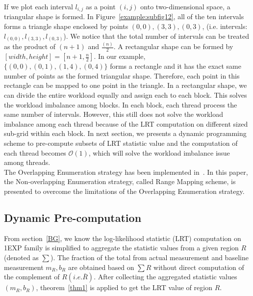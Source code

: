 \documentclass[AMA,LATO1COL]{WileyNJD-v2-bak}
\newcommand\bigo{\mathcal O}
\begin{document}
If we plot each interval $l_{i,j}$ as a point $(i,j)$ onto two-dimensional space, a triangular shape is formed. In Figure~\ref{example:subfig12}, all of the ten intervals forms a triangle shape enclosed by points ${(0,0),(3,3),(0,3)}$, (i.e. intervals: ${l_{(0,0)},l_{(3,3)},l_{(0,3)}}$). We notice that the total number of intervals can be treated as the product of $(n+1)$ and ${\frac{(n)}{2}}$. A rectangular shape can be formed by $[width,height]=[n+1,{\frac{n}{2}}]$. In our example, $\{{(0,0)},{(0,1)},{(1,4)},{(0,4)}\}$ forms a rectangle and it has the exact same number of points as the formed triangular shape. Therefore, each point in this rectangle can be mapped to one point in the triangle. In a rectangular shape, we can divide the entire workload equally and assign each to each block. This solves the workload imbalance among blocks. In each block, each thread process the same number of intervals. However, this still does not solve the workload imbalance among each thread because of the LRT computation on different sized sub-grid within each block. In next section, we presents a dynamic programming scheme to pre-compute subsets of LRT statistic value and the computation of each thread becomes $\bigo(1)$, which will solve the workload imbalance issue among threads. \\
The Overlapping Enumeration strategy has been implemented in~\cite{apweb}. In this paper, the Non-overlapping Enumeration strategy, called Range Mapping scheme, is presented to overcome the limitations of the Overlapping Enumeration strategy.

\subsection{Dynamic Pre-computation}
\label{sec:mov2}
From section~\ref{BG}, we know the log-likelihood statistic (LRT) computation on 1EXP family is simplified to aggregate the statistic values from a given region $R$ (denoted as $\sum $). The fraction of the total from actual measurement and baseline measurement $m_R,b_R$ are obtained based on $\sum R$ without direct computation of the complement of $R (i.e. \bar R)$. After collecting the aggregated statistic values $(m_R,b_R)$, theorem~\ref{thm1} is applied to get the LRT value of region $R$.
\end{document}
